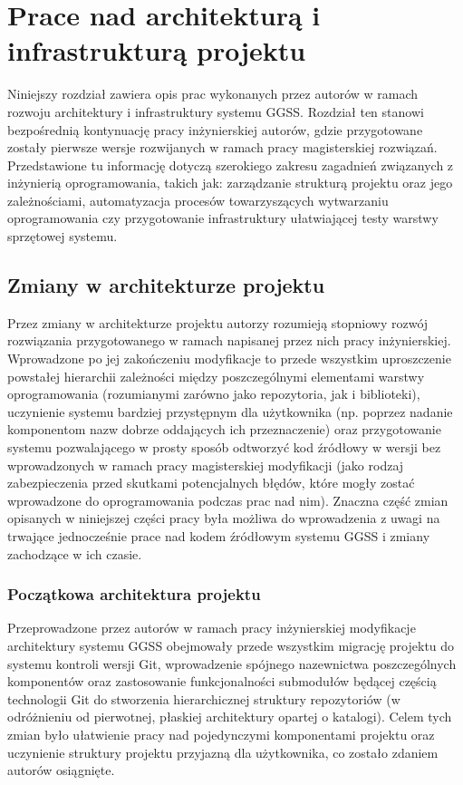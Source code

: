 \chapter{Prace nad architekturą i infrastrukturą projektu}
\label{cha:infra}


Niniejszy rozdział zawiera opis prac wykonanych przez autorów w ramach rozwoju architektury i infrastruktury systemu GGSS. Rozdział ten stanowi bezpośrednią kontynuację pracy inżynierskiej autorów, gdzie przygotowane zostały pierwsze wersje rozwijanych w ramach pracy magisterskiej rozwiązań. Przedstawione tu informację dotyczą szerokiego zakresu zagadnień związanych z inżynierią oprogramowania, takich jak: zarządzanie strukturą projektu oraz jego zależnościami, automatyzacja procesów towarzyszących wytwarzaniu oprogramowania czy przygotowanie infrastruktury ułatwiającej testy warstwy sprzętowej systemu. 

\section{Zmiany w architekturze projektu}
Przez zmiany w architekturze projektu autorzy rozumieją stopniowy rozwój rozwiązania przygotowanego w ramach napisanej przez nich pracy inżynierskiej. Wprowadzone po jej zakończeniu modyfikacje to przede wszystkim uproszczenie powstałej hierarchii zależności między poszczególnymi elementami warstwy oprogramowania (rozumianymi zarówno jako repozytoria, jak i biblioteki), uczynienie systemu bardziej przystępnym dla użytkownika (np. poprzez nadanie komponentom nazw dobrze oddających ich przeznaczenie) oraz przygotowanie systemu pozwalającego w prosty sposób odtworzyć kod źródłowy w wersji bez wprowadzonych w ramach pracy magisterskiej modyfikacji (jako rodzaj zabezpieczenia przed skutkami potencjalnych błędów, które mogły zostać wprowadzone do oprogramowania podczas prac nad nim). Znaczna część zmian opisanych w niniejszej części pracy była możliwa do wprowadzenia z uwagi na trwające jednocześnie prace nad kodem źródłowym systemu GGSS i zmiany zachodzące w ich czasie. 


\subsection{Początkowa architektura projektu}
Przeprowadzone przez autorów w ramach pracy inżynierskiej modyfikacje architektury systemu GGSS obejmowały przede wszystkim migrację projektu do systemu kontroli wersji Git, wprowadzenie spójnego nazewnictwa poszczególnych komponentów oraz zastosowanie funkcjonalności submodułów będącej częścią technologii Git do stworzenia hierarchicznej struktury repozytoriów (w odróżnieniu od pierwotnej, płaskiej architektury opartej o katalogi). Celem tych zmian było ułatwienie pracy nad pojedynczymi komponentami projektu oraz uczynienie struktury projektu przyjazną dla użytkownika, co zostało zdaniem autorów osiągnięte. 

